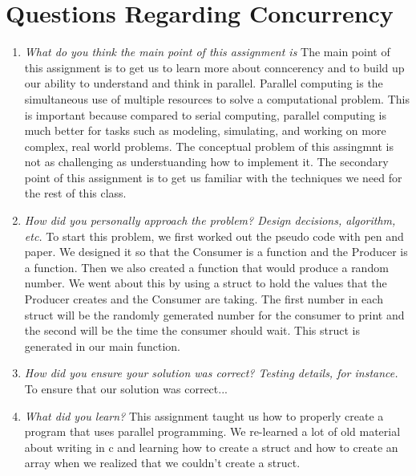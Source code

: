 \section{Questions Regarding Concurrency}
\begin{enumerate}

   \item \textit{What do you think the main point of this assignment is} The main point of this assignment is to get us to learn more about conncerency and to build up our ability to understand and think in parallel. Parallel computing is the simultaneous use of multiple resources to solve a computational problem. This is important because compared to serial computing, parallel computing is much better for tasks such as modeling, simulating, and working on more complex, real world problems. The conceptual problem of this assingmnt is not as challenging as understuanding how to implement it. The secondary point of this assignment is to get us familiar with the techniques we need for the rest of this class. 

   \item \textit{How did you personally approach the problem? Design decisions, algorithm, etc.} To start this problem, we first worked out the pseudo code with pen and paper.  We designed it so that the Consumer is a function and the Producer is a function. Then we also created a function that would produce a random number. We went about this by using a struct to hold the values that the Producer creates and the Consumer are taking. The first number in each struct will be the randomly gemerated number for the consumer to print and the second will be the time the consumer should wait. This struct is generated in our main function.  

   \item \textit{How did you ensure your solution was correct? Testing details, for instance.} To ensure that our solution was correct...

   \item \textit{What did you learn?} This assignment taught us how to properly create a program that uses parallel programming. We re-learned a lot of old material about writing in c and learning how to create a struct and how to create an array when we realized that we couldn't create a struct.  

\end{enumerate}

